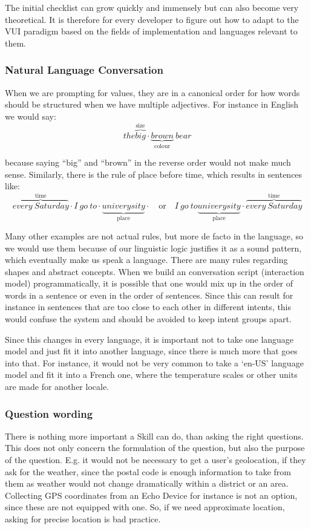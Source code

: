 The initial checklist can grow quickly and immensely but can also become very theoretical. It is therefore for every developer to figure out how to adapt to the VUI paradigm based on the fields of implementation and languages relevant to them. %



\subsubsection*{Natural Language Conversation}
When we are prompting for values, they are in a canonical order for how words should be structured when we have multiple adjectives. For instance in English we would say:
\[
	the 
\overbrace{big}^\text{size} \cdot
\underbrace{brown}_\text{colour}
\ bear 
\]

\noindent because saying ``big'' and ``brown'' in the reverse order would not make much sense. Similarly, there is the rule of place before time, which results in sentences like: 
	\[
	\overbrace{every \ Saturday}^\text{time} \cdot
		I \ go \ to  \cdot
	\underbrace{univerysity}_\text{place} \cdot
	\quad \textrm{or} \quad
	I \ go \ to 
	\underbrace{univerysity}_\text{place} \cdot
	\overbrace{every \ Saturday}^\text{time}
	\]

Many other examples are not actual rules, but more de facto	in the language, so we would use them because of our linguistic logic justifies it as a sound pattern, which eventually make us speak a language. There are many rules regarding shapes and abstract concepts. When we build an conversation script (interaction model) programmatically, it is possible that one would mix up in the order of words in a sentence or even in the order of sentences. Since this can result for instance in sentences that are too close to each other in different intents, this would confuse the system and should be avoided to keep intent groups apart.

Since this changes in every language, it is important not to take one language model and just fit it into another language, since there is much more that goes into that. For instance, it would not be very common to take a `en-US' language model and fit it into a French one, where the temperature scales or other units are made for another locale.


\subsubsection*{Question wording}
There is nothing more important a Skill can do, than asking the right questions. This does not only concern the formulation of the question, but also the purpose of the question. E.g. it would not be necessary to get a user's geolocation, if they ask for the weather, since the postal code is enough information to take from them as weather would not change dramatically within a district or an area. Collecting GPS coordinates from an Echo Device for instance is not an option, since these are not equipped with one. So, if we need approximate location, asking for precise location is bad practice.

